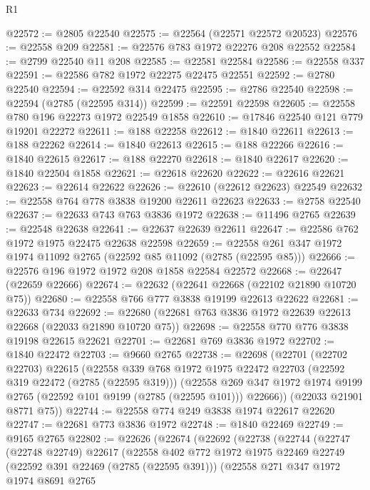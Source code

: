\begin{lexlean}{R1}
\begin{coremodule}
@22572 := @2805 @22540
@22575 := @22564 (@22571 @22572 @20523)
@22576 := @22558 @209
@22581 := @22576 @783 @1972 @22276 @208 @22552
@22584 := @2799 @22540 @11 @208
@22585 := @22581 @22584
@22586 := @22558 @337
@22591 := @22586 @782 @1972 @22275 @22475 @22551
@22592 := @2780 @22540
@22594 := @22592 @314 @22475
@22595 := @2786 @22540
@22598 := @22594 (@2785 (@22595 @314))
@22599 := @22591 @22598
@22605 := @22558 @780 @196 @22273 @1972 @22549 @1858
@22610 := @17846 @22540 @121 @779 @19201 @22272
@22611 := @188 @22258
@22612 := @1840 @22611
@22613 := @188 @22262
@22614 := @1840 @22613
@22615 := @188 @22266
@22616 := @1840 @22615
@22617 := @188 @22270
@22618 := @1840 @22617
@22620 := @1840 @22504 @1858
@22621 := @22618 @22620
@22622 := @22616 @22621
@22623 := @22614 @22622
@22626 := @22610 (@22612 @22623) @22549
@22632 := @22558 @764 @778 @3838 @19200 @22611 @22623
@22633 := @2758 @22540
@22637 := @22633 @743 @763 @3836 @1972
@22638 := @11496 @2765
@22639 := @22548 @22638
@22641 := @22637 @22639 @22611
@22647 := @22586 @762 @1972 @1975 @22475 @22638 @22598
@22659 := @22558 @261 @347 @1972 @1974 @11092 @2765 (@22592 @85 @11092 (@2785 (@22595 @85)))
@22666 := @22576 @196 @1972 @1972 @208 @1858 @22584 @22572
@22668 := @22647 (@22659 @22666)
@22674 := @22632 (@22641 @22668 (@22102 @21890 @10720 @75))
@22680 := @22558 @766 @777 @3838 @19199 @22613 @22622
@22681 := @22633 @734
@22692 := @22680 (@22681 @763 @3836 @1972 @22639 @22613 @22668 (@22033 @21890 @10720 @75))
@22698 := @22558 @770 @776 @3838 @19198 @22615 @22621
@22701 := @22681 @769 @3836 @1972
@22702 := @1840 @22472
@22703 := @9660 @2765
@22738 := @22698
    (@22701
      (@22702 @22703)
      @22615
      (@22558
        @339
        @768
        @1972
        @1975
        @22472
        @22703
        (@22592 @319 @22472 (@2785 (@22595 @319)))
        (@22558 @269 @347 @1972 @1974 @9199 @2765 (@22592 @101 @9199 (@2785 (@22595 @101))) @22666))
      (@22033 @21901 @8771 @75))
@22744 := @22558 @774 @249 @3838 @1974 @22617 @22620
@22747 := @22681 @773 @3836 @1972
@22748 := @1840 @22469
@22749 := @9165 @2765
@22802 := @22626
    (@22674
      (@22692
        (@22738
          (@22744
            (@22747
              (@22748 @22749)
              @22617
              (@22558
                @402
                @772
                @1972
                @1975
                @22469
                @22749
                (@22592 @391 @22469 (@2785 (@22595 @391)))
                (@22558
                  @271
                  @347
                  @1972
                  @1974
                  @8691
                  @2765

\end{coremodule}
\end{lexlean}
